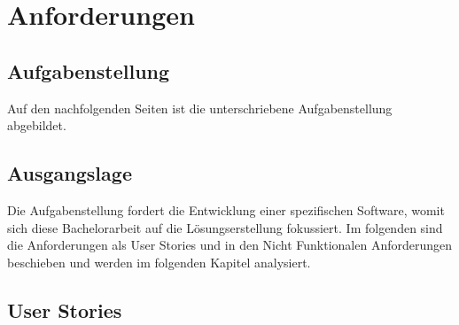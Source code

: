 \chapter{Anforderungen}

\section{Aufgabenstellung}
\label{sec:anforderung:aufgabenstellung}

Auf den nachfolgenden Seiten ist die unterschriebene Aufgabenstellung abgebildet.



\begin{comment}
Ausgangslage (Kontext) und Problembeschreibung bzw. -analyse (mit Beschreibung der
Problemtyps, also ob Fokus Lösungserstellung oder Machbarkeitsanalyse). Anforderungen spezifiziert:
Funktionale Anforderungen z.B. als Use Cases (short) oder User Stories beschrieben, alle relevanten Nichtfunktionalen Anforderungen (NFA) und Qualitätsattribute abgedeckt und überprüfbar beschrieben.
\end{comment}

\section{Ausgangslage}
Die Aufgabenstellung fordert die Entwicklung einer spezifischen Software, womit sich diese Bachelorarbeit auf die Lösungserstellung fokussiert. Im folgenden sind die Anforderungen als User Stories und in den Nicht Funktionalen Anforderungen beschieben und werden im folgenden Kapitel analysiert.
\xxx[]

\section{User Stories}\label{sec:pd:user-stories}

